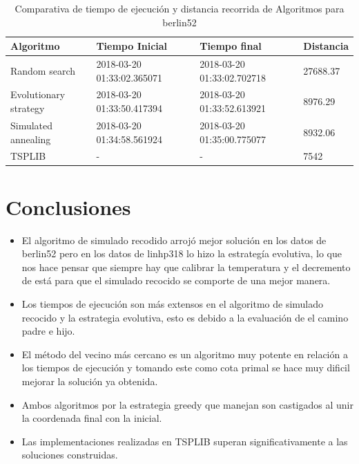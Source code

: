 \documentclass{article}
\begin{document}
\begin{table}[H]
\centering
\caption{Comparativa de tiempo de ejecución y distancia recorrida de Algoritmos para berlin52}
\label{Table:berlin52}
\begin{tabular}{| l | l | l | l |}
\hline
Algoritmo & Tiempo Inicial & Tiempo final & Distancia \\ \hline
Random search & 2018-03-20 01:33:02.365071 & 2018-03-20 01:33:02.702718 & 27688.37 \\ \hline
Evolutionary strategy & 2018-03-20 01:33:50.417394 & 2018-03-20 01:33:52.613921 & 8976.29 \\ \hline
Simulated annealing & 2018-03-20 01:34:58.561924 & 2018-03-20 01:35:00.775077 & 8932.06 \\ \hline
TSPLIB & - & - & 7542 \\ \hline

\end{tabular}
\end{table}

\section{Conclusiones}
\begin{itemize}
\item El algoritmo de simulado recodido arrojó mejor solución en los datos de berlin52 pero en los datos de linhp318 lo hizo la estrategía evolutiva, lo que nos hace pensar que siempre hay que calibrar la temperatura y el decremento de está para que el simulado recocido se comporte de una mejor manera.
\item Los tiempos de ejecución son más extensos en el algoritmo de simulado recocido y la estrategia evolutiva, esto es debido a la evaluación de el camino padre e hijo.
\item El método del vecino más cercano es un algoritmo muy potente en relación a los tiempos de ejecución y tomando este como cota primal se hace muy dificil mejorar la solución ya obtenida.
\item Ambos algoritmos por la estrategia greedy que manejan son castigados al unir la coordenada final con la inicial.
\item Las implementaciones realizadas en TSPLIB superan significativamente a las soluciones construidas.
\end{itemize}
\end{document}
